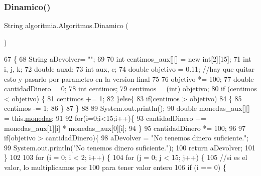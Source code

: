 \subsubsection{\texorpdfstring{Dinamico()}{Dinamico()}}
{\footnotesize\ttfamily String algoritmia.\+Algoritmos.\+Dinamico (\begin{DoxyParamCaption}{ }\end{DoxyParamCaption})\hspace{0.3cm}{\ttfamily [inline]}}


\begin{DoxyCode}
67                               \{
68         String aDevolver= \textcolor{stringliteral}{""};
69         
70         \textcolor{keywordtype}{int} centimos\_aux[][] = \textcolor{keyword}{new} \textcolor{keywordtype}{int}[2][15];
71         \textcolor{keywordtype}{int} i, j, k;
72         \textcolor{keywordtype}{double} auxd;
73         \textcolor{keywordtype}{int} aux, c;
74         \textcolor{keywordtype}{double} objetivo = 0.11; \textcolor{comment}{//hay que quitar esto y pasarlo por parametro en la version final}
75         
76         objetivo *= 100;
77         \textcolor{keywordtype}{double} cantidadDinero = 0;
78         \textcolor{keywordtype}{int} centimos;
79         centimos = (int) objetivo;
80         \textcolor{keywordflow}{if} (centimos < objetivo) \{
81             centimos += 1;
82         \}\textcolor{keywordflow}{else}\{
83             \textcolor{keywordflow}{if}(centimos > objetivo)
84             \{
85                 centimos -= 1;
86             \}
87         \}
88         
89         System.out.println();
90         \textcolor{keywordtype}{double} monedas\_aux[][] = this.\mbox{\hyperlink{classalgoritmia_1_1_algoritmos_a3f6bbaa8358a204e6dc486d7e818146f}{monedas}};
91         
92         \textcolor{keywordflow}{for}(i=0;i<15;i++)\{
93             cantidadDinero += monedas\_aux[1][i] * monedas\_aux[0][i];
94         \}
95         cantidadDinero *= 100;
96         
97         \textcolor{keywordflow}{if}(objetivo > cantidadDinero)\{
98             aDevolver = \textcolor{stringliteral}{"No tenemos dinero suficiente."};
99             System.out.println(\textcolor{stringliteral}{"No tenemos dinero suficiente."});
100             \textcolor{keywordflow}{return} aDevolver;
101         \}
102         
103         \textcolor{keywordflow}{for} (i = 0; i < 2; i++) \{
104             \textcolor{keywordflow}{for} (j = 0; j < 15; j++) \{
105                 \textcolor{comment}{//si es el valor, lo multiplicamos por 100 para tener valor entero}
106                 \textcolor{keywordflow}{if} (i == 0) \{

\end{DoxyCode}
